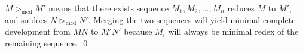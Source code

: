 \begin{pf} \rm
  $M\vartriangleright_{\mathrm{mcd}} M'$ means that there exists
  sequence $M_1,M_2,\ldots, M_n$ reduces $M$ to $M'$, and so does 
  $N\vartriangleright_{\mathrm{mcd}} N'$. Merging the two sequences will yield
  minimal complete development from $MN$ to $M'N'$ because $M_i$ will always
  be minimal redex of the remaining sequence.
  \qed
\end{pf}
